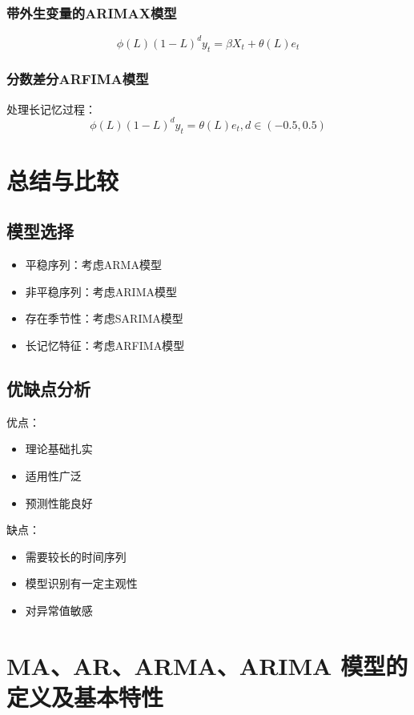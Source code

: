 \subsubsection{带外生变量的ARIMAX模型}
\[\phi(L)(1-L)^d y_t = \beta X_t + \theta(L)e_t\]

\subsubsection{分数差分ARFIMA模型}
处理长记忆过程：
\[\phi(L)(1-L)^d y_t = \theta(L)e_t, d \in (-0.5,0.5)\]

\section{总结与比较}
\subsection{模型选择}
\begin{itemize}
    \item 平稳序列：考虑ARMA模型
    \item 非平稳序列：考虑ARIMA模型
    \item 存在季节性：考虑SARIMA模型
    \item 长记忆特征：考虑ARFIMA模型
\end{itemize}

\subsection{优缺点分析}
优点：
\begin{itemize}
    \item 理论基础扎实
    \item 适用性广泛
    \item 预测性能良好
\end{itemize}

缺点：
\begin{itemize}
    \item 需要较长的时间序列
    \item 模型识别有一定主观性
    \item 对异常值敏感
\end{itemize}



\section*{MA、AR、ARMA、ARIMA 模型的定义及基本特性}

